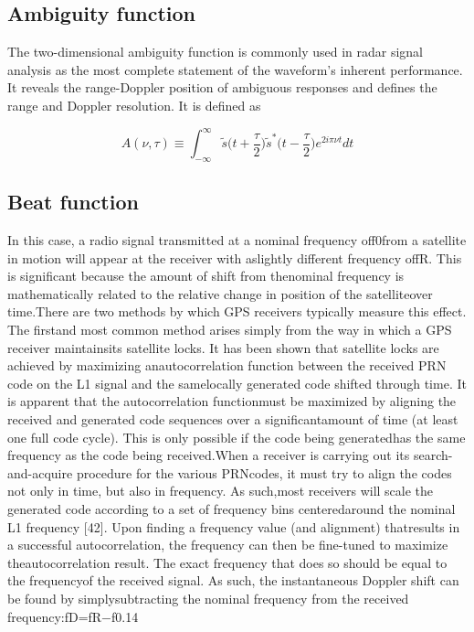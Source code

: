 \subsection{Ambiguity function}
The two-dimensional ambiguity function is commonly used in radar signal  analysis as the most complete statement of the waveform's inherent performance. It reveals the range-Doppler position of ambiguous responses and defines the range and Doppler resolution. It is defined as 

\begin{equation}
A(\nu,\tau)\equiv\int_{-\infty}^{\infty}\tilde{s}\big(t+\frac{\tau}{2}\big)\tilde{s}^*\big(t-\frac{\tau}{2}\big)e^{2i\pi\nu t} dt
\end{equation}

\subsection{Beat function}
In this case, a radio signal transmitted at a nominal frequency off0from a satellite in motion will appear at the receiver with aslightly different frequency offR.  This is significant because the amount of shift from thenominal frequency is mathematically related to the relative change in position of the satelliteover time.There are two methods by which GPS receivers typically measure this effect.  The firstand most common method arises simply from the way in which a GPS receiver maintainsits  satellite  locks.   It  has  been  shown  that  satellite  locks  are  achieved  by  maximizing  anautocorrelation  function  between  the  received  PRN  code  on  the  L1  signal  and  the  samelocally generated code shifted through time.  It is apparent that the autocorrelation functionmust be maximized by aligning the received and generated code sequences over a significantamount of time (at least one full code cycle).  This is only possible if the code being generatedhas the same frequency as the code being received.When  a  receiver  is  carrying  out  its  search-and-acquire  procedure  for  the  various  PRNcodes,  it  must  try  to  align  the  codes  not  only  in  time,  but  also  in  frequency.   As  such,most receivers will scale the generated code according to a set of frequency bins centeredaround the nominal L1 frequency [42].  Upon finding a frequency value (and alignment) thatresults in a successful autocorrelation, the frequency can then be fine-tuned to maximize theautocorrelation result.  The exact frequency that does so should be equal to the frequencyof  the  received  signal.   As  such,  the  instantaneous  Doppler  shift  can  be  found  by  simplysubtracting the nominal frequency from the received frequency:fD=fR−f0.14

